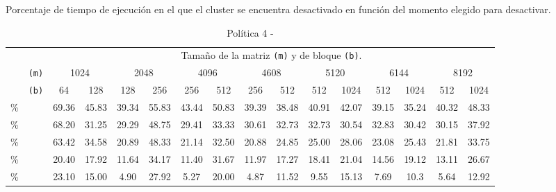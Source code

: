 \begin{table}
  \centering
  \caption{Porcentaje de tiempo de ejecución en el que el cluster se
    encuentra desactivado en función del momento elegido para desactivar.}
  \label{tab:tam-colas-tiempo}
  {\scriptsize
    \begin{tabular}{cccccccccccccccc}
      \toprule
      \multicolumn{2}{c}{\phantom{a}} & \multicolumn{14}{c}{Tamaño de la matriz \texttt{(m)} y
                                        de bloque \texttt{(b)}.} \\ \cmidrule{2-16}
      \phantom{4} & \texttt{(m)} & \multicolumn{2}{c}{1024} & \multicolumn{2}{c}{2048} &                                                                         \multicolumn{2}{c}{4096} & \multicolumn{2}{c}{4608} & \multicolumn{2}{c}{5120} & \multicolumn{2}{c}{6144} & \multicolumn{2}{c}{8192} \\
      \phantom{a} & \texttt{(b)} & 64 & 128 & 128 & 256 & 256 & 512 & 256 & 512 & 512 & 1024 & 512 & 1024 & 512 & 1024 \\ \hline

{\sc 50\%} & \phantom{a} &69.36 & 45.83 & 39.34 & 55.83 & 43.44 & 50.83 & 39.39 & 38.48 & 40.91 & 42.07 & 39.15 & 35.24 & 40.32 & 48.33 \\
{\sc 40\%} & \phantom{a} &68.20 & 31.25 & 29.29 & 48.75 & 29.41 & 33.33 & 30.61 & 32.73 & 32.73 & 30.54 & 32.83 & 30.42& 30.15 & 37.92 \\
{\sc 30\%} & \phantom{a} &63.42 & 34.58 & 20.89 & 48.33 & 21.14 & 32.50 & 20.88 & 24.85 & 25.00 & 28.06 & 23.08 & 25.43& 21.81 & 33.75 \\
{\sc 20\%} & \phantom{a} &20.40 & 17.92 & 11.64 & 34.17 & 11.40 & 31.67 & 11.97 & 17.27 & 18.41 & 21.04 & 14.56 & 19.12& 13.11 & 26.67 \\
{\sc 10\%} & \phantom{a} &23.10 & 15.00 & 4.90  & 27.92 & 5.27  & 20.00 & 4.87 & 11.52  & 9.55 & 15.13 &7.69 & 10.3 & 5.64 & 12.92 \\ \bottomrule
    \end{tabular}
    \caption*{Política 4 - \juno}
  }



\end{table}
